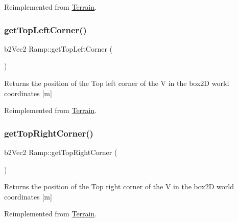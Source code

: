 Reimplemented from \mbox{\hyperlink{class_terrain_a26e1c7c05b8256015730df34d97d29c2}{Terrain}}.

\mbox{\label{class_ramp_aefcb53f7b43d3706400e7f16c77a7e18}} 
\subsubsection{\texorpdfstring{get\+Top\+Left\+Corner()}{getTopLeftCorner()}}
{\footnotesize\ttfamily b2\+Vec2 Ramp\+::get\+Top\+Left\+Corner (\begin{DoxyParamCaption}{ }\end{DoxyParamCaption})\hspace{0.3cm}{\ttfamily [virtual]}}

\begin{DoxyReturn}{Returns}
the position of the Top left corner of the V in the box2D world coordinates \mbox{[}m\mbox{]} 
\end{DoxyReturn}


Reimplemented from \mbox{\hyperlink{class_terrain_a8a8629396e5cb03961649acdc23eacf2}{Terrain}}.

\mbox{\label{class_ramp_a72b5d41278e4ff65df8f80657ae7d9e1}} 
\subsubsection{\texorpdfstring{get\+Top\+Right\+Corner()}{getTopRightCorner()}}
{\footnotesize\ttfamily b2\+Vec2 Ramp\+::get\+Top\+Right\+Corner (\begin{DoxyParamCaption}{ }\end{DoxyParamCaption})\hspace{0.3cm}{\ttfamily [virtual]}}

\begin{DoxyReturn}{Returns}
the position of the Top right corner of the V in the box2D world coordinates \mbox{[}m\mbox{]} 
\end{DoxyReturn}


Reimplemented from \mbox{\hyperlink{class_terrain_a10fcf414cba83e769d99156fe16aa795}{Terrain}}.

\mbox{\label{class_ramp_a25dce9bce336a8524be1de1abd6f1af3}} 
